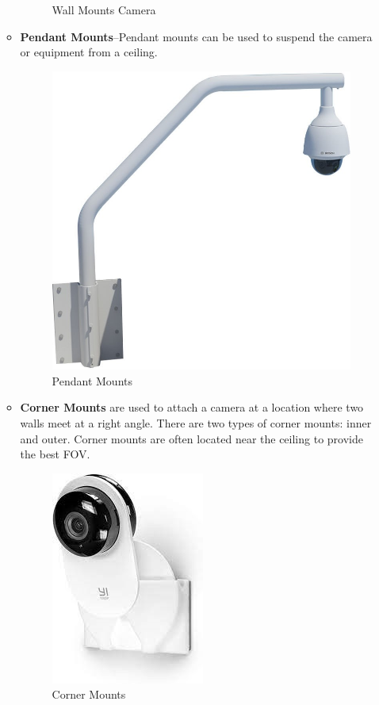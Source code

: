 \documentclass[12pt,fleqn]{book} %
\begin{document}
\begin{enumerate}
\begin{itemize}
\begin{figure}[!h]
    \caption{Wall Mounts Camera}
    \label{fig:c 7}
    \end{figure}
         \item  \textbf{Pendant Mounts}–Pendant mounts can be used to suspend the camera or equipment from a ceiling.
            \begin{figure}[!h]
    \centering
    \includegraphics[width=0.4\linewidth]{c 8.jpg}
    \caption{Pendant Mounts}
    \label{fig:c 8}
    \end{figure}
          \item \textbf{Corner Mounts} are used to attach a camera at a location where two walls meet at a right angle. There are two types of corner mounts: inner and outer. Corner mounts are often located near the ceiling to provide the best FOV. 
                   \begin{figure}[!h]
    \centering
    \includegraphics[width=0.5\linewidth]{c 9.jpg}
    \caption{Corner Mounts}
    \label{fig:c 9}
    \end{figure}
          

\end{itemize}
\end{enumerate}
\end{document}

